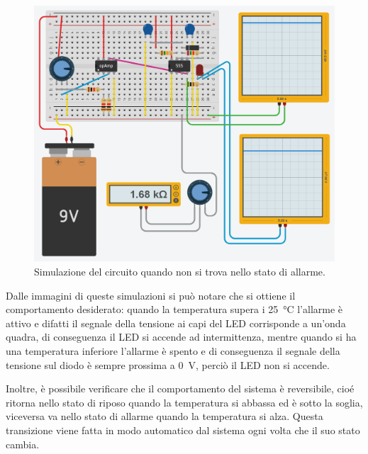 \documentclass{report}
\begin{document}
\begin{figure}[h!]
	\centering
	\includegraphics[width=\textwidth]{immagini/tinkercad_off}
	\caption{Simulazione del circuito quando non si trova nello stato di allarme.} 
	\label{figura:tinkercad_off}
\end{figure}

Dalle immagini di queste simulazioni si può notare che si ottiene il comportamento desiderato: quando la temperatura supera i \SI{25}{\celsius} l'allarme è attivo e difatti il segnale della tensione ai capi del LED corrisponde a un'onda quadra, di conseguenza il LED si accende ad intermittenza, mentre quando si ha una temperatura inferiore l'allarme è spento e di conseguenza il segnale della tensione sul diodo è sempre prossima a \SI{0}{\volt}, perciò il LED non si accende. 

Inoltre, è possibile verificare che il comportamento del sistema è reversibile, cioé ritorna nello stato di riposo quando la temperatura si abbassa ed è sotto la soglia, viceversa va nello stato di allarme quando la temperatura si alza. Questa transizione viene fatta in modo automatico dal sistema ogni volta che il suo stato cambia.
\end{document}
